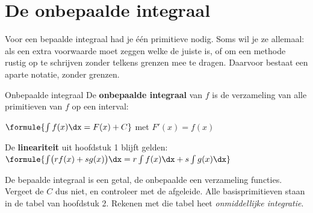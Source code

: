 \begin{oefeningen}[Start]

\end{oefeningen}


\section{De onbepaalde integraal}

Voor een bepaalde integraal had je één primitieve nodig. Soms wil je ze allemaal: als een extra voorwaarde moet zeggen welke de juiste is, of om een methode rustig op te schrijven zonder telkens grenzen mee te dragen. Daarvoor bestaat een aparte notatie, zonder grenzen.

\begin{theorie}
\begin{stelling}{Onbepaalde integraal}
De \textbf{\textcolor{accent}{onbepaalde integraal}} van $f$ is de verzameling van alle primitieven van $f$ op een interval:

\vspace{1mm}
\qquad $\formule{\int f(x)\dx = F(x) + C}$ \quad met $F'(x) = f(x)$
\end{stelling}

De \textbf{\textcolor{accent}{lineariteit}} uit hoofdstuk 1 blijft gelden: \quad $\formule{\int \bigl(r f(x) + s g(x)\bigr)\dx = r\int f(x)\dx + s\int g(x)\dx}$
\end{theorie}

De bepaalde integraal is een getal, de onbepaalde een verzameling functies. Vergeet de $C$ dus niet, en controleer met de afgeleide. Alle basisprimitieven staan in de tabel van hoofdstuk 2. Rekenen met die tabel heet \emph{onmiddellijke integratie}.


